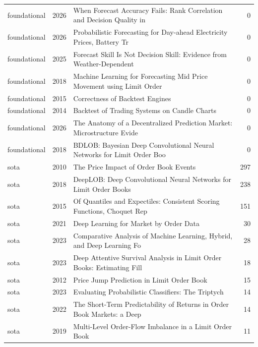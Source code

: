 \begin{longtable}{llp{9.2cm}r}
foundational & 2026 & When Forecast Accuracy Fails: Rank Correlation and Decision Quality in~\citep{falezza2026when} & 0 \\
foundational & 2026 & Probabilistic Forecasting for Day-ahead Electricity Prices, Battery Tr~\citep{hirsch2026probabilistic} & 0 \\
foundational & 2025 & Forecast Skill Is Not Decision Skill: Evidence from Weather-Dependent ~\citep{raeth2025forecast} & 0 \\
foundational & 2018 & Machine Learning for Forecasting Mid Price Movement using Limit Order ~\citep{nousi2018machine} & 0 \\
foundational & 2015 & Correctness of Backtest Engines~\citep{low2015correctness} & 0 \\
foundational & 2014 & Backtest of Trading Systems on Candle Charts~\citep{maierpaape2014backtest} & 0 \\
foundational & 2026 & The Anatomy of a Decentralized Prediction Market: Microstructure Evide~\citep{dubach2026anatomy} & 0 \\
foundational & 2018 & BDLOB: Bayesian Deep Convolutional Neural Networks for Limit Order Boo~\citep{zhang2018bdlob} & 0 \\
sota & 2010 & The Price Impact of Order Book Events~\citep{rama2010price} & 297 \\
sota & 2018 & DeepLOB: Deep Convolutional Neural Networks for Limit Order Books~\citep{zihao2018deeplob} & 238 \\
sota & 2015 & Of Quantiles and Expectiles: Consistent Scoring Functions, Choquet Rep~\citep{werner2015quantiles} & 151 \\
sota & 2021 & Deep Learning for Market by Order Data~\citep{zihao2021deep} & 30 \\
sota & 2023 & Comparative Analysis of Machine Learning, Hybrid, and Deep Learning Fo~\citep{ampountolas2023comparative} & 28 \\
sota & 2023 & Deep Attentive Survival Analysis in Limit Order Books: Estimating Fill~\citep{alvaro2023deep} & 18 \\
sota & 2012 & Price Jump Prediction in Limit Order Book~\citep{zheng2012price} & 15 \\
sota & 2023 & Evaluating Probabilistic Classifiers: The Triptych~\citep{timo2023evaluating} & 14 \\
sota & 2022 & The Short-Term Predictability of Returns in Order Book Markets: a Deep~\citep{lorenzo2022short} & 14 \\
sota & 2019 & Multi-Level Order-Flow Imbalance in a Limit Order Book~\citep{ke2019multi} & 11 \\

\end{longtable}
